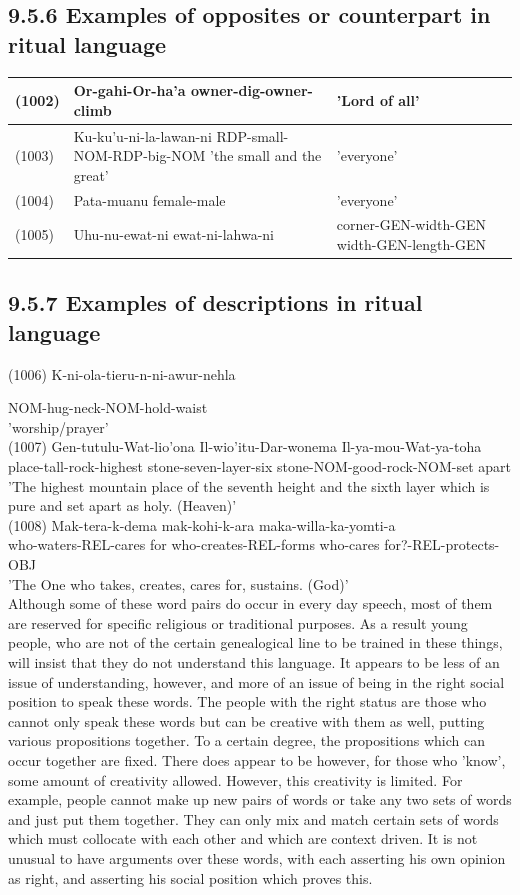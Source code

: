 \documentclass[10pt]{article}
\begin{document}
\subsection*{9.5.6 Examples of opposites or counterpart in ritual language}
\begin{center}
\begin{tabular}{|l|l|l|}
\hline
(1002) & Or-gahi-Or-ha'a owner-dig-owner-climb & 'Lord of all' \\
\hline
(1003) & Ku-ku'u-ni-la-lawan-ni RDP-small-NOM-RDP-big-NOM 'the small and the great' & 'everyone' \\
\hline
(1004) & Pata-muanu female-male & 'everyone' \\
\hline
(1005) & Uhu-nu-ewat-ni ewat-ni-lahwa-ni & corner-GEN-width-GEN width-GEN-length-GEN \\
\hline
\end{tabular}
\end{center}

\subsection*{9.5.7 Examples of descriptions in ritual language}
(1006) K-ni-ola-tieru-n-ni-awur-nehla

NOM-hug-neck-NOM-hold-waist\\
'worship/prayer'\\
(1007) Gen-tutulu-Wat-lio'ona Il-wio'itu-Dar-wonema Il-ya-mou-Wat-ya-toha\\
place-tall-rock-highest stone-seven-layer-six stone-NOM-good-rock-NOM-set apart\\
'The highest mountain place of the seventh height and the sixth layer which is pure and set apart as holy. (Heaven)'\\
(1008) Mak-tera-k-dema mak-kohi-k-ara maka-willa-ka-yomti-a\\
who-waters-REL-cares for who-creates-REL-forms who-cares for?-REL-protects-OBJ\\
'The One who takes, creates, cares for, sustains. (God)'\\
Although some of these word pairs do occur in every day speech, most of them are reserved for specific religious or traditional purposes. As a result young people, who are not of the certain genealogical line to be trained in these things, will insist that they do not understand this language. It appears to be less of an issue of understanding, however, and more of an issue of being in the right social position to speak these words. The people with the right status are those who cannot only speak these words but can be creative with them as well, putting various propositions together. To a certain degree, the propositions which can occur together are fixed. There does appear to be however, for those who 'know', some amount of creativity allowed. However, this creativity is limited. For example, people cannot make up new pairs of words or take any two sets of words and just put them together. They can only mix and match certain sets of words which must collocate with each other and which are context driven. It is not unusual to have arguments over these words, with each asserting his own opinion as right, and asserting his social position which proves this.
\end{document}
